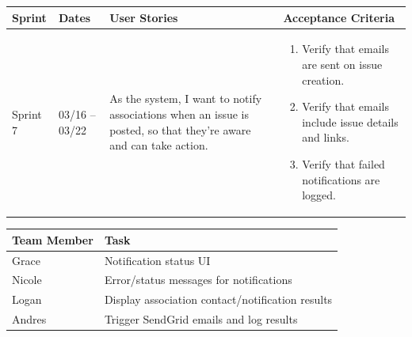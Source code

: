\documentclass[12pt]{article}
\begin{document}
\vspace{0.5em}

\noindent
\begin{tabular}{|L{1.2cm}|L{1.8cm}|L{5.2cm}|L{6.3cm}|}
\hline
\textbf{Sprint} & \textbf{Dates} & \textbf{User Stories} & \textbf{Acceptance Criteria} \\
\hline
Sprint 7 & 03/16 -- 03/22 &
As the system, I want to notify associations when an issue is posted, so that they're aware and can take action. &
\begin{enumerate}
    \item Verify that emails are sent on issue creation.
    \item Verify that emails include issue details and links.
    \item Verify that failed notifications are logged.
\end{enumerate} \\
\hline
\end{tabular}

\vspace{0.5em}

\noindent
\begin{tabular}{|L{2.5cm}|L{12.5cm}|}
\hline
\textbf{Team Member} & \textbf{Task} \\
\hline
Grace & Notification status UI \\
\hline
Nicole & Error/status messages for notifications \\
\hline
Logan & Display association contact/notification results \\
\hline
Andres & Trigger SendGrid emails and log results \\
\hline
\end{tabular}

\vspace{2em}


\vspace{0.5em}
\end{document}
